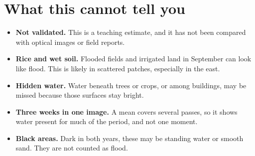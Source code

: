 \section{What this cannot tell you}
\begin{itemize}
\item \textbf{Not validated.} This is a teaching estimate, and it has not been compared with optical images or field reports.
\item \textbf{Rice and wet soil.} Flooded fields and irrigated land in September can look like flood. This is likely in scattered patches, especially in the east.
\item \textbf{Hidden water.} Water beneath trees or crops, or among buildings, may be missed because those surfaces stay bright.
\item \textbf{Three weeks in one image.} A mean covers several passes, so it shows water present for much of the period, and not one moment.
\item \textbf{Black areas.} Dark in both years, these may be standing water or smooth sand. They are not counted as flood.
\end{itemize}
